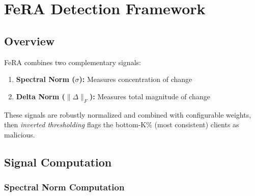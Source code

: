 \documentclass[11pt,a4paper]{article}
\begin{document}
\begin{center}
\end{center}

\section{FeRA Detection Framework}

\subsection{Overview}

FeRA combines two complementary signals:
\begin{enumerate}
    \item \textbf{Spectral Norm ($\sigma$):} Measures concentration of change
    \item \textbf{Delta Norm ($\|\Delta\|_F$):} Measures total magnitude of change
\end{enumerate}

These signals are robustly normalized and combined with configurable weights, then \emph{inverted thresholding} flags the bottom-K\% (most consistent) clients as malicious.

\subsection{Signal Computation}

\subsubsection{Spectral Norm Computation}
\end{document}
